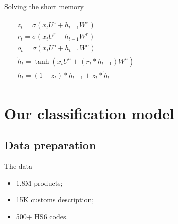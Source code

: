\documentclass[9pt]{beamer}
\begin{document}
\begin{frame}{Solving the short memory}
{\begin{center}
\begin{tabular}{ c  m{5cm} }
				& $$
					\begin{array}{l} 
						z_t = \sigma\left( x_t U^z + h_{t-1} W^z\right) \\
						r_t = \sigma\left( x_t U^r + h_{t-1} W^r\right) \\
						o_t = \sigma\left( x_t U^o + h_{t-1} W^o\right) \\
						\widetilde{h}_t = \tanh \left( x_t U^h +(r_t \ast h_{t-1}) W^h \right)\\
						h_t =  \left( 1-z_t \right) \ast h_{t-1} + z_t \ast \widetilde{h}_t
					\end{array} 
				$$ \\
			\end{tabular}
		\end{center}
	}
	
	
\end{frame}


\section{Our classification model}



\subsection{Data preparation}
\begin{frame}{The data}
	\begin{itemize}
		\item 1.8M products;
		\item 15K customs description;
		\item 500+ HS6 codes.
	\end{itemize}
\end{frame}
\end{document}
